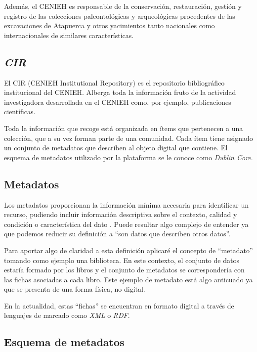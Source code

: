 Además, el CENIEH es responsable de la conservación, restauración,
gestión y registro de las colecciones paleontológicas y arqueológicas
procedentes de las excavaciones de Atapuerca y otros yacimientos tanto
nacionales como internacionales de similares características.

\subsection{\emph{CIR}}

El CIR \cite{weboff:cir} (CENIEH Institutional Repository) es el
repositorio bibliográfico institucional del CENIEH. Alberga toda la
información fruto de la actividad investigadora desarrollada en el
CENIEH como, por ejemplo, publicaciones científicas. 

Toda la información que recoge está organizada en ítems que pertenecen 
a una colección, que a su vez forman parte de una comunidad. Cada ítem 
tiene asignado un conjunto de metadatos que describen al objeto digital 
que contiene. El esquema de metadatos utilizado por la plataforma se le 
conoce como \emph{Dublin Core}.

\subsection{Metadatos}

Los metadatos proporcionan la información mínima necesaria para
identificar un recurso, pudiendo incluir información descriptiva sobre
el contexto, calidad y condición o característica del dato \cite{art:meta}. Puede resultar
algo complejo de entender ya que podemos reducir su definición a ``son
datos que describen otros datos''.

Para aportar algo de claridad a esta definición aplicaré el concepto de
``metadato'' tomando como ejemplo una biblioteca. En este contexto, el
conjunto de datos estaría formado por los libros y el conjunto de
metadatos se correspondería con las fichas asociadas a cada libro. Este
ejemplo de metadato está algo anticuado ya que se presenta de una forma
física, no digital.


En la actualidad, estas ``fichas'' se encuentran en formato digital a
través de lenguajes de marcado como \emph{XML} o \emph{RDF}.

\subsection{Esquema de metadatos}

